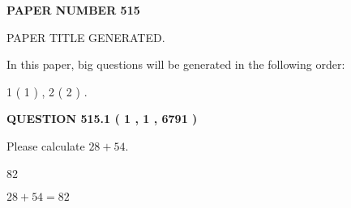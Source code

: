 \documentclass[12pt]{article}
\begin{document}
   
   
   
\newpage 
\setcounter{page}{ 
   515001 } 
   
   
   
   
 {\textbf{ \Large{ PAPER NUMBER  515  }}}
   
   
\vspace{0.2in}
   
   
   
   
   
   
   
   
 \vspace{0.2in}
 
 
 
 
   
   
 PAPER TITLE GENERATED.
   
   
   
\vspace{0.2in}
   
In this paper, big questions will be generated in the following order: 
   
   
   1 ( 1 )
 ,
   2 ( 2 )
 .
  
\vspace{0.2in}
  
{\textbf{\Large{QUESTION
515.1 
 ( 1 , 1 , 6791 )
}}}
  
  
 
Please calculate $ %
28 +  %
54 $.
 
 
 
\noindent{}
 
 

82
 
 
\noindent{}
 
 

 
 
 
\noindent{}
 
 

$ %
28 +  %
54=   %
82$
 
 
\noindent{}
 
 

 
   
   
   
\end{document}

